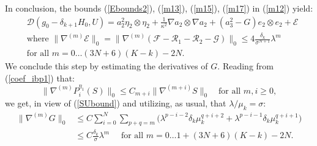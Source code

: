 \documentclass[reqno,twoside,11pt]{amsart}
\numberwithin{equation}{section}
\theoremstyle{plain}
\theoremstyle{definition}
\begin{document}
In conclusion, the bounds (\ref{Ebounds2}), (\ref{m13}), (\ref{m15}), (\ref{m17}) in (\ref{m12}) yield:
\begin{equation}\label{m18}
\begin{split}
& \mathcal{D}(g_0-\delta_{k+1}H_0, U) = a_2^2\eta_2\otimes\eta_2 +
\frac{1}{\kappa^2}\nabla a_2\otimes\nabla a_2 + (a_3^2-G)e_2\otimes e_2
+ \mathcal{E} \\
& \mbox{where } \|\nabla^{(m)}\mathcal{E}\|_0 =
\|\nabla^{(m)}(\mathcal{F} - \mathcal{R}_1 - \mathcal{R}_2- \mathcal{G})\|_0
\leq 4\frac{\delta_k}{\sigma^{N+1}}\lambda^m
\\ &  \mbox{for all } m=0\ldots (3N+6)(K-k)-2N.
\end{split}
\end{equation}
We conclude this step by estimating the derivatives of $G$. Reading from (\ref{coef_ibp1}) that:
\begin{equation*}%
\|\nabla^{(m)}P_i^{\eta_1}(S)\|_0\leq
C_{m+i}\|\nabla^{(m+i)}S\|_0\quad\mbox{for all } m,i\geq 0,
\end{equation*}
we get, in view of (\ref{SUbound}) and utilizing, as usual, that $\lambda/\mu_k=\sigma$:
\begin{equation}\label{m20}
\begin{split}
\|\nabla^{(m)}G\|_0 & \leq C\sum_{i=0}^N\sum_{p+q=m}\Big(\lambda^{p-i-2}\delta_k\mu_k^{q+i+2}
+ \lambda^{p-i-1}\delta_k\mu_k^{q+i+1}\Big) \\ & \leq C\frac{\delta_k}{\sigma}\lambda^m
\quad \mbox{ for all } m=0\ldots 1+(3N+6)(K-k)-2N.
\end{split}
\end{equation}

\smallskip
\end{document}
